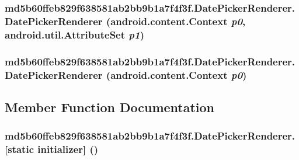 \hypertarget{classmd5b60ffeb829f638581ab2bb9b1a7f4f3f_1_1_date_picker_renderer_de65698654faac1638d89be69a76bf07}{
\subsubsection[{DatePickerRenderer}]{\setlength{\rightskip}{0pt plus 5cm}md5b60ffeb829f638581ab2bb9b1a7f4f3f.DatePickerRenderer.DatePickerRenderer (android.content.Context {\em p0}, \/  android.util.AttributeSet {\em p1})}}
\label{classmd5b60ffeb829f638581ab2bb9b1a7f4f3f_1_1_date_picker_renderer_de65698654faac1638d89be69a76bf07}


\hypertarget{classmd5b60ffeb829f638581ab2bb9b1a7f4f3f_1_1_date_picker_renderer_e5cb2d0f611ae56a000a816dff6a4b6d}{
\subsubsection[{DatePickerRenderer}]{\setlength{\rightskip}{0pt plus 5cm}md5b60ffeb829f638581ab2bb9b1a7f4f3f.DatePickerRenderer.DatePickerRenderer (android.content.Context {\em p0})}}
\label{classmd5b60ffeb829f638581ab2bb9b1a7f4f3f_1_1_date_picker_renderer_e5cb2d0f611ae56a000a816dff6a4b6d}




\subsection{Member Function Documentation}
\hypertarget{classmd5b60ffeb829f638581ab2bb9b1a7f4f3f_1_1_date_picker_renderer_d5a159d87c6505feeea28c86f60c8407}{
\subsubsection[{[static initializer]}]{\setlength{\rightskip}{0pt plus 5cm}md5b60ffeb829f638581ab2bb9b1a7f4f3f.DatePickerRenderer.\mbox{[}static initializer\mbox{]} ()}}
\label{classmd5b60ffeb829f638581ab2bb9b1a7f4f3f_1_1_date_picker_renderer_d5a159d87c6505feeea28c86f60c8407}




